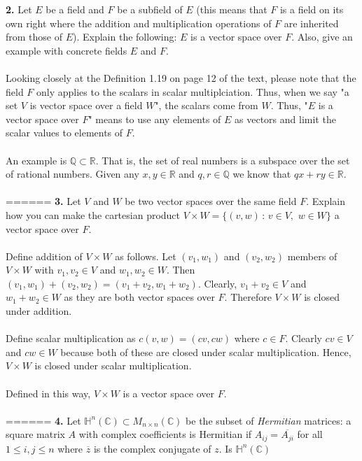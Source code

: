 \documentclass[11pt]{amsart}
\theoremstyle{definition}  %
\newcommand{\Q}{\mathbb{Q}}
\newcommand{\R}{\mathbb{R}}
\newcommand{\C}{\mathbb{C}}
\begin{document}
\vskip 0.1cm
\noindent
{\bf 2.} Let $E$ be a field and $F$ be a subfield of $E$ (this means that $F$ 
is a field on its own right where the addition and multiplication operations of $F$ are inherited from those of $E$). 
Explain the following: $E$ is a vector space over $F$. Also, give an example with concrete fields $E$ and $F$.\\ 
\\
Looking closely at the Definition 1.19 on page 12 of the text, please note that the field $F$ only applies to the scalars in scalar multiplciation.  Thus, when we say "a set $V$ is vector space over a field $W$", the scalars come from $W$.  Thus, "$E$ is a vector space over $F$" means to use any elements of $E$ as vectors and limit the scalar values to elements of $F$.\\
\\
An example is $\Q \subset \R$.  That is, the set of real numbers is a subspace over the set of rational numbers.  Given any $x,y \in \R$ and $q,r \in \Q$ we know that $qx+ry \in \R$.\\
\\
======
\vskip 0.1cm
\noindent
{\bf 3.} Let $V$ and $W$ be two vector spaces over the same field $F$. Explain how you can 
make the cartesian product $V \times W = \{(v,w) \, : \, v \in V, \,\, w \in W\}$ a vector space over $F$. \\
\\
Define addition of $V \times W$ as follows.  Let $(v_1,w_1)$ and $(v_2, w_2)$ members of $V \times W$ with $v_1,v_2 \in V$ and $w_1,w_2 \in W$.  Then $(v_1,w_1)+(v_2,w_2)=(v_1+v_2,w_1+w_2)$.  Clearly, $v_1+v_2\in V$ and $w_1+w_2 \in W$ as they are both vector spaces over $F$.  Therefore $V\times W$ is closed under addition.\\
\\
Define scalar multiplication as $c(v,w)=(cv,cw)$ where $c \in F$.  Clearly $cv\in V$ and $cw\in W$ because both of these are closed under scalar multiplication.  Hence, $V\times W$ is closed under scalar multiplication.\\
\\
Defined in this way, $V \times W$ is a vector space over $F$.\\
\\
======
\newpage
\vskip 0.1cm
\noindent
{\bf 4.} Let $\mathbb{H}^n(\C) \subset M_{n \times n}(\C)$ be the subset of {\it Hermitian} matrices:  a square matrix $A$ with complex coefficients
is Hermitian if $A_{ij} = \overline{A_{ji}}$ for all $1 \leq i,j \leq n$ where $\overline{z}$ is the complex conjugate of $z$. Is $\mathbb{H}^n(\C)$
\end{document}
